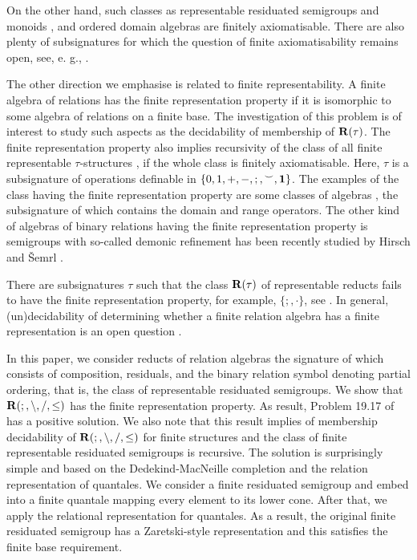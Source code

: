 \documentclass[a4paper]{article}
\theoremstyle{definition}
\theoremstyle{theorem}
\theoremstyle{proposition}
\theoremstyle{lemma}
\theoremstyle{ex}
\theoremstyle{corollary}
\theoremstyle{claim}
\begin{document}
On the other hand, such classes as representable residuated semigroups and monoids \cite{andreka1994lambek}, and ordered domain algebras \cite{hirsch2013ordered} are finitely axiomatisable. There are also plenty of subsignatures for which the question of finite axiomatisability remains open, see, e. g., \cite{andreka2011axiomatizability}.

The other direction we emphasise is related to finite representability. A finite algebra of relations has the finite representation property if it is isomorphic to some algebra of relations on a finite base. The investigation of this problem is of interest to study such aspects as the decidability of membership of ${\bf R}(\tau)$. The finite representation property also implies recursivity of the class of all finite representable $\tau$-structures \cite{hirsch2004finite}, if the whole class is finitely axiomatisable.  Here, $\tau$ is a subsignature of operations definable in $\{ 0, 1, +, -, ;, {}^{\smile}, {\bf 1 } \}$. The examples of the class having the finite representation property are some classes of algebras \cite{hirsch2004finite} \cite{hirsch2013ordered} \cite{mclean2016finite}, the subsignature of which contains the domain and range operators. The other kind of algebras of binary relations having the finite representation property is semigroups with so-called demonic refinement has been recently studied by Hirsch and \v{S}emrl \cite{hirsch2021finite}.

There are subsignatures $\tau$ such that the class ${\bf R}(\tau)$ of representable reducts fails to have the finite representation property, for example, $\{;, \cdot\}$, see \cite[Theorem 4.1]{hirsch2021finite}. In general, (un)decidability of determining whether a finite relation algebra has a finite representation is an open question \cite[Problem 18.18]{hirsch2002relation}.

In this paper, we consider reducts of relation algebras the signature of which consists of composition, residuals, and the binary relation symbol denoting partial ordering, that is, the class of representable residuated semigroups. We show that ${\bf R}(;, \setminus, /, \leq)$ has the finite representation property. As result, Problem 19.17 of \cite{hirsch2002relation} has a positive solution. We also note that this result implies of membership decidability of ${\bf R}(;, \setminus, /, \leq)$ for finite structures and the class of finite representable residuated semigroups is recursive. The solution is surprisingly simple and based on the Dedekind-MacNeille completion and the relation representation of quantales. We consider a finite residuated semigroup and embed into a finite quantale mapping every element to its lower cone. After that, we apply the relational representation for quantales. As a result, the original finite residuated semigroup has a Zaretski-style representation \cite{zaretskii1959representation} and this satisfies the finite base requirement.
\end{document}
